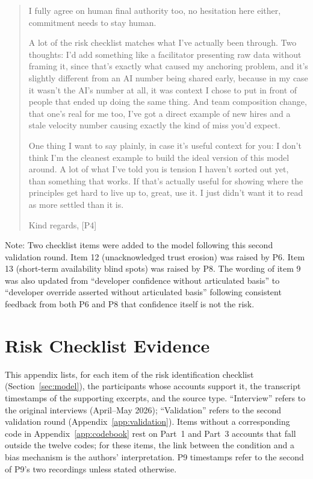 \documentclass[a4paper,twoside]{bth}
\begin{document}
\begin{quote}
I fully agree on human final authority too, no hesitation here either, commitment needs to stay human.

A lot of the risk checklist matches what I've actually been through. Two thoughts: I'd add something like a facilitator presenting raw data without framing it, since that's exactly what caused my anchoring problem, and it's slightly different from an AI number being shared early, because in my case it wasn't the AI's number at all, it was context I chose to put in front of people that ended up doing the same thing. And team composition change, that one's real for me too, I've got a direct example of new hires and a stale velocity number causing exactly the kind of miss you'd expect.

One thing I want to say plainly, in case it's useful context for you: I don't think I'm the cleanest example to build the ideal version of this model around. A lot of what I've told you is tension I haven't sorted out yet, than something that works. If that's actually useful for showing where the principles get hard to live up to, great, use it. I just didn't want it to read as more settled than it is.

Kind regards,
[P4]
\end{quote}

\noindent Note: Two checklist items were added to the model following this second validation round. Item 12 (unacknowledged trust erosion) was raised by P6. Item 13 (short-term availability blind spots) was raised by P8. The wording of item 9 was also updated from ``developer confidence without articulated basis'' to ``developer override asserted without articulated basis'' following consistent feedback from both P6 and P8 that confidence itself is not the risk.


\chapter{Risk Checklist Evidence}
\label{app:checklist_evidence}

This appendix lists, for each item of the risk identification checklist (Section~\ref{sec:model}), the participants whose accounts support it, the transcript timestamps of the supporting excerpts, and the source type. ``Interview'' refers to the original interviews (April--May 2026); ``Validation'' refers to the second validation round (Appendix~\ref{app:validation}). Items without a corresponding code in Appendix~\ref{app:codebook} rest on Part~1 and Part~3 accounts that fall outside the twelve codes; for these items, the link between the condition and a bias mechanism is the authors' interpretation. P9 timestamps refer to the second of P9's two recordings unless stated otherwise.
\end{document}
